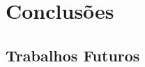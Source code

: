 %
%

\chapter{Conclusões}
\label{cap:conclusoes}


\section{Trabalhos Futuros}
\label{sec:trabalhosFuturos}

